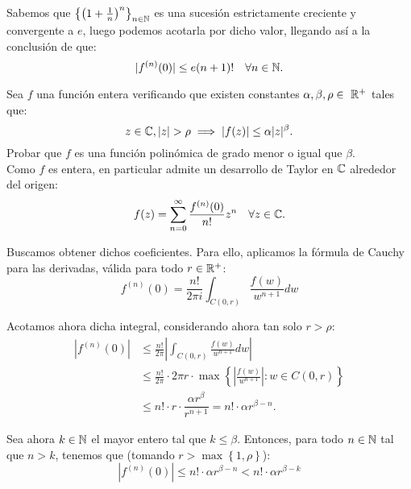 \begin{ejercicio}
    Sabemos que $\left\{\left(1+\frac{1}{n}\right)^n\right\}_{n\in \mathbb{N}}$ es una sucesión estrictamente creciente y convergente a $e$, luego podemos acotarla por dicho valor, llegando así a la conclusión de que:
    \begin{equation*}
        |f^{(n)}(0)|\leq e(n+1)! \quad \forall n\in \mathbb{N}.
    \end{equation*}
\end{ejercicio}

\begin{ejercicio}\label{ej:9.2}
    Sea $f$ una función entera verificando que existen constantes $\alpha,\beta,\rho\in~\mathbb{R}^+$ tales que:
    \begin{equation*}
        z\in \bb{C}, |z|>\rho \implies |f(z)|\leq \alpha |z|^\beta.
    \end{equation*}
    Probar que $f$ es una función polinómica de grado menor o igual que $\beta$.\\

    Como $f$ es entera, en particular admite un desarrollo de Taylor en $\mathbb{C}$ alrededor del origen:
    \begin{equation*}
        f(z)=\sum_{n=0}^{\infty} \dfrac{f^{(n)}(0)}{n!} z^n \quad \forall z\in \mathbb{C}.
    \end{equation*}

    Buscamos obtener dichos coeficientes. Para ello, aplicamos la fórmula de Cauchy para las derivadas, válida para todo $r\in \mathbb{R}^+$:
    \begin{equation*}
        f^{(n)}(0)=\frac{n!}{2\pi i} \int_{C(0,r)} \frac{f(w)}{w^{n+1}} dw
    \end{equation*}

    Acotamos ahora dicha integral, considerando ahora tan solo $r>\rho$:
    \begin{align*}
        |f^{(n)}(0)| &\leq \frac{n!}{2\pi} \left| \int_{C(0,r)} \frac{f(w)}{w^{n+1}} dw \right| \\
        &\leq \frac{n!}{2\pi}\cdot 2\pi r\cdot \max\left\{ \left| \frac{f(w)}{w^{n+1}} \right| : w\in C(0,r) \right\} \\
        &\leq n!\cdot r\cdot \dfrac{\alpha r^\beta}{r^{n+1}} = n!\cdot \alpha r^{\beta-n}.
    \end{align*}

    Sea ahora $k\in \mathbb{N}$ el mayor entero tal que $k\leq \beta$. Entonces, para todo $n\in \mathbb{N}$ tal que $n>k$, tenemos que (tomando $r > \max\left\{1,\rho \right\}$):
    \begin{equation*}
        |f^{(n)}(0)|\leq n!\cdot \alpha r^{\beta-n}<n!\cdot \alpha r^{\beta-k}
    \end{equation*}


\end{ejercicio}
